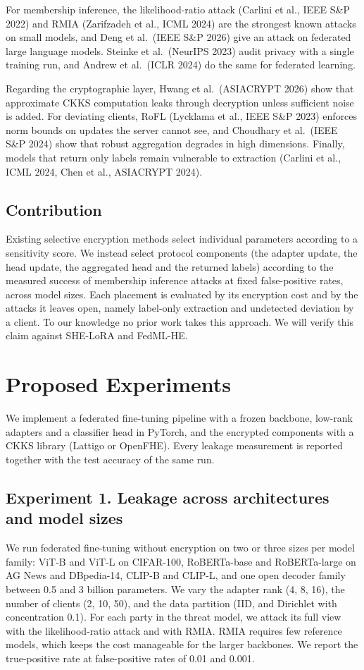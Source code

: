 \documentclass[10pt,a4paper]{article}
\begin{document}
For membership inference, the likelihood-ratio attack (Carlini et al., IEEE S\&P 2022) and RMIA (Zarifzadeh et al., ICML 2024) are the strongest known attacks on small models, and Deng et al.\ (IEEE S\&P 2026) give an attack on federated large language models. Steinke et al.\ (NeurIPS 2023) audit privacy with a single training run, and Andrew et al.\ (ICLR 2024) do the same for federated learning.

Regarding the cryptographic layer, Hwang et al.\ (ASIACRYPT 2026) show that approximate CKKS computation leaks through decryption unless sufficient noise is added. For deviating clients, RoFL (Lycklama et al., IEEE S\&P 2023) enforces norm bounds on updates the server cannot see, and Choudhary et al.\ (IEEE S\&P 2024) show that robust aggregation degrades in high dimensions. Finally, models that return only labels remain vulnerable to extraction (Carlini et al., ICML 2024, Chen et al., ASIACRYPT 2024).

\subsection*{Contribution}

Existing selective encryption methods select individual parameters according to a sensitivity score. We instead select protocol components (the adapter update, the head update, the aggregated head and the returned labels) according to the measured success of membership inference attacks at fixed false-positive rates, across model sizes. Each placement is evaluated by its encryption cost and by the attacks it leaves open, namely label-only extraction and undetected deviation by a client. To our knowledge no prior work takes this approach. We will verify this claim against SHE-LoRA and FedML-HE.

\section{Proposed Experiments}

We implement a federated fine-tuning pipeline with a frozen backbone, low-rank adapters and a classifier head in PyTorch, and the encrypted components with a CKKS library (Lattigo or OpenFHE). Every leakage measurement is reported together with the test accuracy of the same run.

\subsection*{Experiment 1. Leakage across architectures and model sizes}
We run federated fine-tuning without encryption on two or three sizes per model family: ViT-B and ViT-L on CIFAR-100, RoBERTa-base and RoBERTa-large on AG News and DBpedia-14, CLIP-B and CLIP-L, and one open decoder family between 0.5 and 3 billion parameters. We vary the adapter rank (4, 8, 16), the number of clients (2, 10, 50), and the data partition (IID, and Dirichlet with concentration 0.1). For each party in the threat model, we attack its full view with the likelihood-ratio attack and with RMIA. RMIA requires few reference models, which keeps the cost manageable for the larger backbones. We report the true-positive rate at false-positive rates of 0.01 and 0.001.
\end{document}
